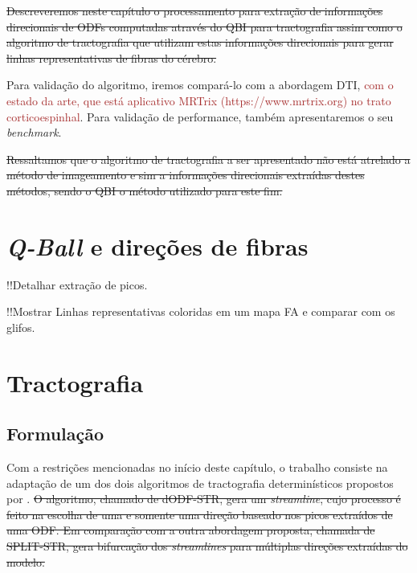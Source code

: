 \documentclass[
    12pt,                %
    oneside,            %
    a4paper,            %
    english,            %
    french,                %
    spanish,            %
    brazil                %
    ]{abntex2}
\begin{document}
\sout{Descreveremos neste capítulo o processamento para extração de informações direcionais de ODFs computadas através do QBI para tractografia assim como o algoritmo de tractografia que utilizam estas informações direcionais para gerar linhas representativas de fibras do cérebro.}

Para validação do algoritmo, iremos compará-lo com a abordagem DTI, \textcolor{brown}{com o estado da arte, que está aplicativo MRTrix (https://www.mrtrix.org) \cite{tournier2019} no trato corticoespinhal}. Para validação de performance, também apresentaremos o seu \textit{benchmark}.

\sout{Ressaltamos que o algoritmo de tractografia a ser apresentado não está atrelado a método de imageamento e sim a informações direcionais extraídas destes métodos, sendo o QBI o método utilizado para este fim.}


\section{\textit{Q-Ball} e direções de fibras}


!!Detalhar extração de picos.

!!Mostrar Linhas representativas coloridas em um mapa FA e comparar com os glifos.

\section{Tractografia}

\subsection{Formulação}

Com a restrições mencionadas no início deste capítulo, o trabalho consiste na adaptação de um dos dois algoritmos de tractografia determinísticos propostos por . \sout{O algoritmo, chamado de dODF-STR, gera um \textit{streamline}, cujo processo é feito na escolha de uma e somente uma direção baseado nos picos extraídos de uma ODF. Em comparação com a outra abordagem proposta, chamada de SPLIT-STR, gera bifurcação dos \textit{streamlines} para múltiplas direções extraídas do modelo.}
\end{document}

